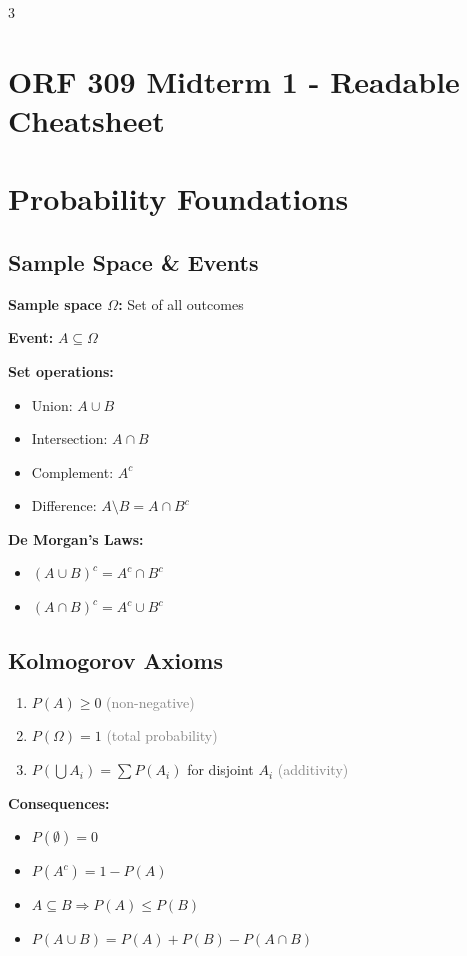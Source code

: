\documentclass[10pt,landscape]{article}
\newcommand{\note}[1]{\textcolor{gray}{\small(#1)}}
\begin{document}
\begin{multicols}{3}
\small

\section*{ORF 309 Midterm 1 - Readable Cheatsheet}

\section{Probability Foundations}

\subsection{Sample Space \& Events}
\textbf{Sample space $\Omega$:} Set of all outcomes

\textbf{Event:} $A \subseteq \Omega$

\textbf{Set operations:}
\begin{itemize}[leftmargin=*,noitemsep]
\item Union: $A \cup B$
\item Intersection: $A \cap B$
\item Complement: $A^c$
\item Difference: $A \setminus B = A \cap B^c$
\end{itemize}

\textbf{De Morgan's Laws:}
\begin{itemize}[leftmargin=*,noitemsep]
\item $(A \cup B)^c = A^c \cap B^c$
\item $(A \cap B)^c = A^c \cup B^c$
\end{itemize}

\subsection{Kolmogorov Axioms}
\begin{enumerate}[leftmargin=*,noitemsep]
\item $P(A) \geq 0$ \note{non-negative}
\item $P(\Omega) = 1$ \note{total probability}
\item $P(\bigcup A_i) = \sum P(A_i)$ for disjoint $A_i$ \note{additivity}
\end{enumerate}

\textbf{Consequences:}
\begin{itemize}[leftmargin=*,noitemsep]
\item $P(\emptyset) = 0$
\item $P(A^c) = 1 - P(A)$
\item $A \subseteq B \Rightarrow P(A) \leq P(B)$
\item $P(A \cup B) = P(A) + P(B) - P(A \cap B)$
\end{itemize}


\end{multicols}
\end{document}
